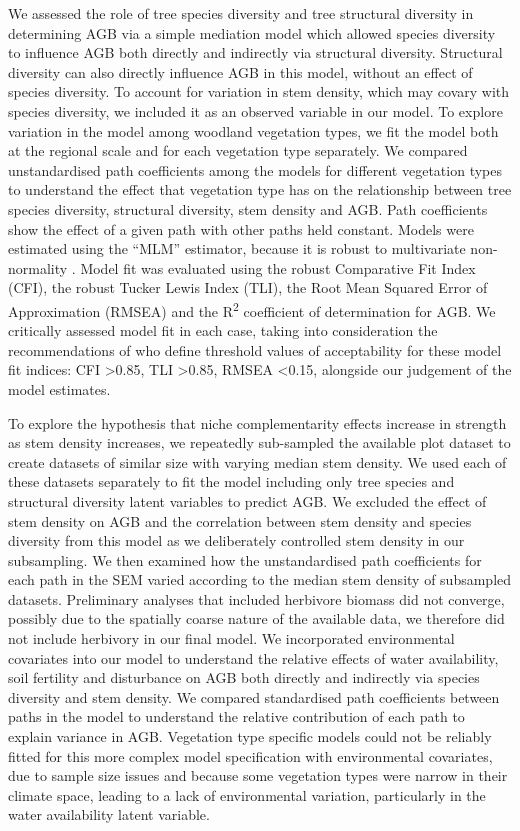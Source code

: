 \documentclass[11pt,a4paper]{article}
\begin{document}
We assessed the role of tree species diversity and tree structural diversity in determining AGB via a simple mediation model which allowed species diversity to influence AGB both directly and indirectly via structural diversity. Structural diversity can also directly influence AGB in this model, without an effect of species diversity. To account for variation in stem density, which may covary with species diversity, we included it as an observed variable in our model. To explore variation in the model among woodland vegetation types, we fit the model both at the regional scale and for each vegetation type separately. We compared unstandardised path coefficients among the models for different vegetation types to understand the effect that vegetation type has on the relationship between tree species diversity, structural diversity, stem density and AGB. Path coefficients show the effect of a given path with other paths held constant. Models were estimated using the ``MLM'' estimator, because it is robust to multivariate non-normality \citep{Shapiro1983}. Model fit was evaluated using the robust Comparative Fit Index (CFI), the robust Tucker Lewis Index (TLI), the Root Mean Squared Error of Approximation (RMSEA) and the R\textsuperscript{2} coefficient of determination for AGB. We critically assessed model fit in each case, taking into consideration the recommendations of \citet{Hu1999} who define threshold values of acceptability for these model fit indices: CFI >0.85, TLI >0.85, RMSEA <0.15, alongside our judgement of the model estimates.

To explore the hypothesis that niche complementarity effects increase in strength as stem density increases, we repeatedly sub-sampled the available plot dataset to create \subn{} datasets of similar size with varying median stem density. We used each of these datasets separately to fit the model including only tree species and structural diversity latent variables to predict AGB. We excluded the effect of stem density on AGB and the correlation between stem density and species diversity from this model as we deliberately controlled stem density in our subsampling. We then examined how the unstandardised path coefficients for each path in the SEM varied according to the median stem density of subsampled datasets. Preliminary analyses that included herbivore biomass \citep{Hempson2017} did not converge, possibly due to the spatially coarse nature of the available data, we therefore did not include herbivory in our final model. We incorporated environmental covariates into our model to understand the relative effects of water availability, soil fertility and disturbance on AGB both directly and indirectly via species diversity and stem density. We compared standardised path coefficients between paths in the model to understand the relative contribution of each path to explain variance in AGB. Vegetation type specific models could not be reliably fitted for this more complex model specification with environmental covariates, due to sample size issues and because some vegetation types were narrow in their climate space, leading to a lack of environmental variation, particularly in the water availability latent variable.
\end{document}

